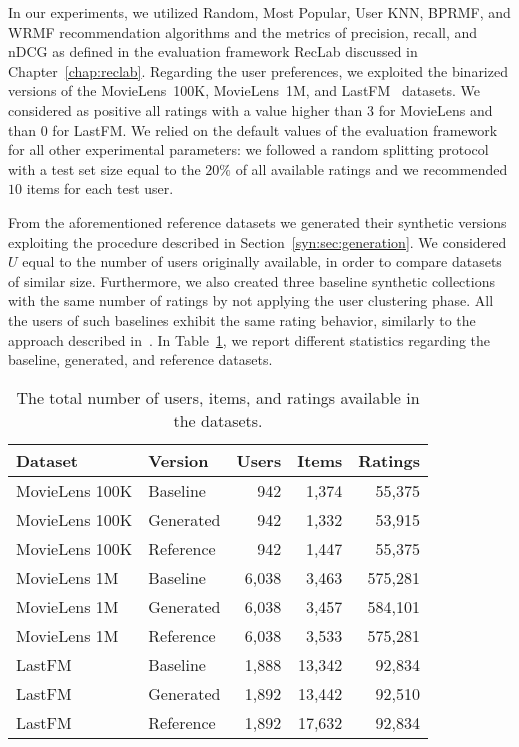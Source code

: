 In our experiments, we utilized Random, Most Popular, User KNN, BPRMF, and WRMF recommendation algorithms and the metrics of precision, recall, and nDCG as defined in the evaluation framework RecLab discussed in Chapter~\ref{chap:reclab}. Regarding the user preferences, we exploited the binarized versions of the MovieLens~100K, MovieLens~1M, and LastFM~\cite{Cantador2011} datasets. We considered as positive all ratings with a value higher than $3$ for MovieLens and than $0$ for LastFM. We relied on the default values of the evaluation framework for all other experimental parameters: we followed a random splitting protocol with a test set size equal to the $20\%$ of all available ratings and we recommended $10$ items for each test user.

From the aforementioned reference datasets we generated their synthetic versions exploiting the procedure described in Section~\ref{syn:sec:generation}. We considered $U$ equal to the number of users originally available, in order to compare datasets of similar size. Furthermore, we also created three baseline synthetic collections with the same number of ratings by not applying the user clustering phase. All the users of such baselines exhibit the same rating behavior, similarly to the approach described in~\cite{CarmenRodriguez-Hernandez2017}. In Table~\ref{syn:tab:stats}, we report different statistics regarding the baseline, generated, and reference datasets.

\begin{table}
\centering
\begin{tabular}{@{}llrrr@{}}
\toprule
Dataset & Version & Users & Items & Ratings \\ \midrule
MovieLens 100K & Baseline & 942 & 1,374 & 55,375 \\
MovieLens 100K & Generated & 942 & 1,332 & 53,915 \\
MovieLens 100K & Reference & 942 & 1,447 & 55,375 \\ \midrule
MovieLens 1M & Baseline & 6,038 & 3,463 & 575,281 \\
MovieLens 1M & Generated & 6,038 & 3,457 & 584,101 \\
MovieLens 1M & Reference & 6,038 & 3,533 & 575,281 \\ \midrule
LastFM & Baseline & 1,888 & 13,342 & 92,834 \\
LastFM & Generated & 1,892 & 13,442 & 92,510 \\
LastFM & Reference & 1,892 & 17,632 & 92,834 \\ \bottomrule
\end{tabular}
\caption[Statistics about the synthetic datasets]{The total number of users, items, and ratings available in the datasets.}
\label{syn:tab:stats}
\end{table}

